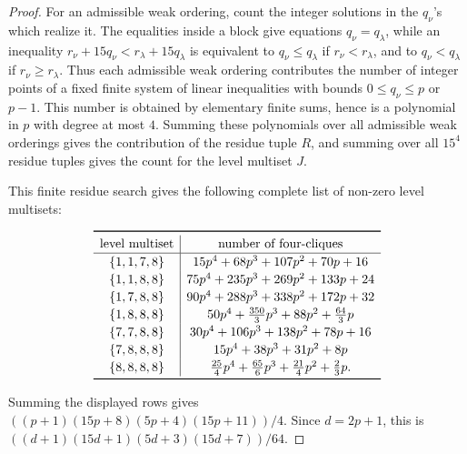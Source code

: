 \documentclass[12pt]{article}
\theoremstyle{plain}
\theoremstyle{definition}
\renewcommand{\leq}{\leqslant}
\renewcommand{\geq}{\geqslant}
\begin{document}
\begin{proof}
For an admissible weak ordering, count the integer solutions in the
\(q_\nu\)'s which realize it.  The equalities inside a block give equations
\(q_\nu=q_\lambda\), while an inequality
\(r_\nu+15q_\nu<r_\lambda+15q_\lambda\)
is equivalent to \(q_\nu\leq q_\lambda\) if \(r_\nu<r_\lambda\), and to
\(q_\nu<q_\lambda\) if \(r_\nu\geq r_\lambda\).  Thus each admissible weak
ordering contributes the number of integer points of a fixed finite system of
linear inequalities with bounds \(0\leq q_\nu\leq p\) or \(p-1\).  This number
is obtained by elementary finite sums, hence is a polynomial in \(p\) with degree at most $4$.  Summing
these polynomials over all admissible weak orderings gives the contribution of
the residue tuple \(R\), and summing over all \(15^4\) residue tuples gives the
count for the level multiset \(J\).
 
This finite residue search gives the following
complete list of non-zero level multisets:
\begin{center}
\[
\renewcommand{\arraystretch}{1.15}
\begin{array}{c|c}
\toprule
\text{level multiset}&\text{number of four-cliques}\\
\hline
\{1,1,7,8\}&15p^4+68p^3+107p^2+70p+16\\
\{1,1,8,8\}&75p^4+235p^3+269p^2+133p+24\\
\{1,7,8,8\}&90p^4+288p^3+338p^2+172p+32\\
\{1,8,8,8\}&50p^4+\frac{350}{3}p^3+88p^2+\frac{64}{3}p\\
\{7,7,8,8\}&30p^4+106p^3+138p^2+78p+16\\
\{7,8,8,8\}&15p^4+38p^3+31p^2+8p\\
\{8,8,8,8\}&\frac{25}{4}p^4+\frac{65}{6}p^3+\frac{21}{4}p^2+\frac{2}{3}p.\\
\bottomrule
\end{array}
\] 
\label{tab:E8-L2-clique-counts}
\end{center}
Summing the displayed rows gives
\(((p+1)(15p+8)(5p+4)(15p+11))/4\).
Since \(d=2p+1\), this is
\(((d+1)(15d+1)(5d+3)(15d+7))/64\).


\end{proof}
\end{document}
